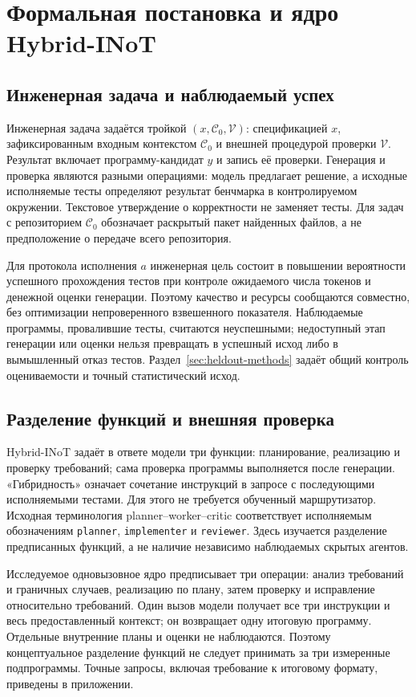 \section{Формальная постановка и ядро Hybrid-INoT}
\label{sec:hybrid-core}

\subsection{Инженерная задача и наблюдаемый успех}
Инженерная задача задаётся тройкой $(x,\mathcal{C}_0,\mathcal{V})$: спецификацией $x$, зафиксированным входным контекстом $\mathcal{C}_0$ и внешней процедурой проверки $\mathcal{V}$. Результат включает программу-кандидат $y$ и запись её проверки. Генерация и проверка являются разными операциями: модель предлагает решение, а исходные исполняемые тесты определяют результат бенчмарка в контролируемом окружении. Текстовое утверждение о корректности не заменяет тесты. Для задач с репозиторием $\mathcal{C}_0$ обозначает раскрытый пакет найденных файлов, а не предположение о передаче всего репозитория.

Для протокола исполнения $a$ инженерная цель состоит в повышении вероятности успешного прохождения тестов при контроле ожидаемого числа токенов и денежной оценки генерации. Поэтому качество и ресурсы сообщаются совместно, без оптимизации непроверенного взвешенного показателя. Наблюдаемые программы, провалившие тесты, считаются неуспешными; недоступный этап генерации или оценки нельзя превращать в успешный исход либо в вымышленный отказ тестов. Раздел~\ref{sec:heldout-methods} задаёт общий контроль оцениваемости и точный статистический исход.

\subsection{Разделение функций и внешняя проверка}
Hybrid-INoT задаёт в ответе модели три функции: планирование, реализацию и проверку требований; сама проверка программы выполняется после генерации. «Гибридность» означает сочетание инструкций в запросе с последующими исполняемыми тестами. Для этого не требуется обученный маршрутизатор. Исходная терминология planner--worker--critic соответствует исполняемым обозначениям \texttt{planner}, \texttt{implementer} и \texttt{reviewer}. Здесь изучается разделение предписанных функций, а не наличие независимо наблюдаемых скрытых агентов.

Исследуемое одновызовное ядро предписывает три операции: анализ требований и граничных случаев, реализацию по плану, затем проверку и исправление относительно требований. Один вызов модели получает все три инструкции и весь предоставленный контекст; он возвращает одну итоговую программу. Отдельные внутренние планы и оценки не наблюдаются. Поэтому концептуальное разделение функций не следует принимать за три измеренные подпрограммы. Точные запросы, включая требование к итоговому формату, приведены в приложении.

